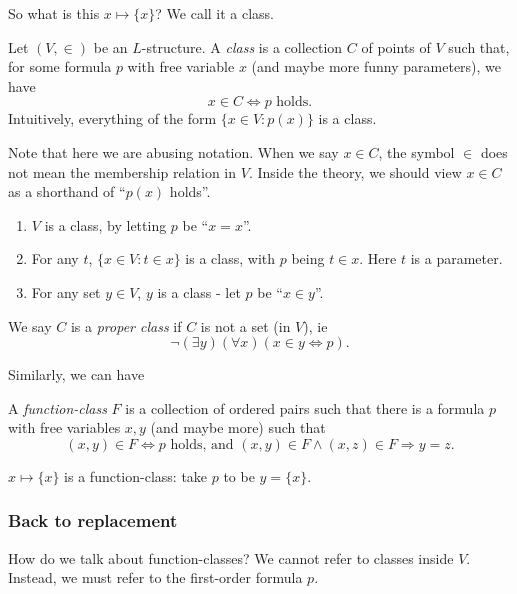 \documentclass[a4paper]{article}
\begin{document}
So what is this $x\mapsto \{x\}$? We call it a class.
\begin{defi}[Class]
  Let $(V, \in)$ be an $L$-structure. A \emph{class} is a collection $C$ of points of $V$ such that, for some formula $p$ with free variable $x$ (and maybe more funny parameters), we have
  \[
    x\in C\Leftrightarrow p\text{ holds}.
  \]
  Intuitively, everything of the form $\{x\in V: p(x)\}$ is a class.
\end{defi}
Note that here we are abusing notation. When we say $x\in C$, the symbol $\in$ does not mean the membership relation in $V$. Inside the theory, we should view $x\in C$ as a shorthand of ``$p(x)$ holds''.

\begin{eg}\leavevmode
  \begin{enumerate}
    \item $V$ is a class, by letting $p$ be ``$x = x$''.
    \item For any $t$, $\{x\in V: t\in x\}$ is a class, with $p$ being $t\in x$. Here $t$ is a parameter.
    \item For any set $y\in V$, $y$ is a class - let $p$ be ``$x\in y$''.
  \end{enumerate}
\end{eg}

\begin{defi}
  We say $C$ is a \emph{proper class} if $C$ is not a set (in $V$), ie
  \[
    \neg (\exists y)(\forall x)(x\in y\Leftrightarrow p).
  \]
\end{defi}

Similarly, we can have
\begin{defi}
  A \emph{function-class} $F$ is a collection of ordered pairs such that there is a formula $p$ with free variables $x, y$ (and maybe more) such that
  \[
    (x, y) \in F \Leftrightarrow p\text{ holds, and } (x, y)\in F\wedge (x, z)\in F \Rightarrow  y = z.
  \]
\end{defi}

\begin{eg}
  $x\mapsto \{x\}$ is a function-class: take $p$ to be $y = \{x\}$.
\end{eg}

\subsubsection*{Back to replacement}
How do we talk about function-classes? We cannot refer to classes inside $V$. Instead, we must refer to the first-order formula $p$.
\end{document}
